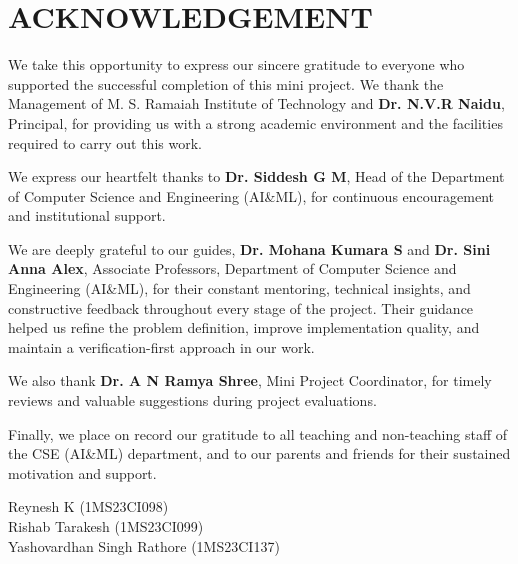 
\chapter*{\centering ACKNOWLEDGEMENT}


%

We take this opportunity to express our sincere gratitude to everyone who supported the successful completion of this mini project. We thank the Management of M. S. Ramaiah Institute of Technology and \textbf{Dr. N.V.R Naidu}, Principal, for providing us with a strong academic environment and the facilities required to carry out this work.

We express our heartfelt thanks to \textbf{Dr. Siddesh G M}, Head of the Department of Computer Science and Engineering (AI\&ML), for continuous encouragement and institutional support.

We are deeply grateful to our guides, \textbf{Dr. Mohana Kumara S} and \textbf{Dr. Sini Anna Alex}, Associate Professors, Department of Computer Science and Engineering (AI\&ML), for their constant mentoring, technical insights, and constructive feedback throughout every stage of the project. Their guidance helped us refine the problem definition, improve implementation quality, and maintain a verification-first approach in our work.

We also thank \textbf{Dr. A N Ramya Shree}, Mini Project Coordinator, for timely reviews and valuable suggestions during project evaluations.

Finally, we place on record our gratitude to all teaching and non-teaching staff of the CSE (AI\&ML) department, and to our parents and friends for their sustained motivation and support.

\begin{flushright}
Reynesh K (1MS23CI098)\\
Rishab Tarakesh (1MS23CI099)\\
Yashovardhan Singh Rathore (1MS23CI137)\\
\end{flushright}

\thispagestyle{plain}
